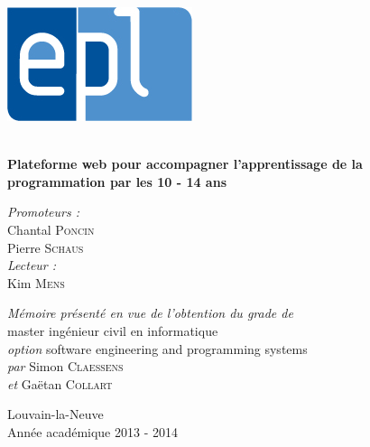 \begin{titlepage}
\begin{center}
\begin{minipage}{0.20\textwidth}
\includegraphics[width=\textwidth]{img/epl}\\
\end{minipage}

\vfill
\hrulefill 
\\[0.4cm]
{ \huge \bfseries Plateforme web pour accompagner l'apprentissage de la programmation par les 10 - 14 ans}
\\[0.1cm]
\hrulefill
\vfill
 
\begin{minipage}{0.49\textwidth}
\begin{flushleft}
\emph{Promoteurs :} \\
Chantal \textsc{Poncin} \\ 
Pierre \textsc{Schaus} \\
\emph{Lecteur :} \\
Kim \textsc{Mens} \\
\end{flushleft}
\end{minipage}
\begin{minipage}{0.5\textwidth}
\begin{flushright}
\emph{Mémoire présenté en vue de l'obtention du grade de} \\
master ingénieur civil en informatique \\
\emph{option} software engineering and programming systems \\
\emph{par} Simon \textsc{Claessens}\\
\emph{et}  Ga\"{e}tan \textsc{Collart} \\
\end{flushright}
\end{minipage}

\vfill
{\large Louvain-la-Neuve} \\
{\large Année académique 2013 - 2014} 
\end{center}
\end{titlepage}
